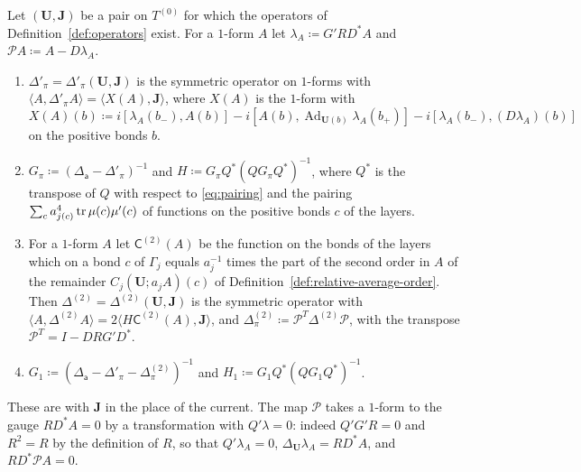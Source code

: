 \documentclass[11pt]{preprint}
\newcommand{\Ad}{\operatorname{Ad}}
\numberwithin{equation}{section}
\begin{document}
\begin{definition}\label{def:landau-operators}
Let $(\mathbf U, \mathbf J)$ be a pair on $T^{(0)}$ for which the operators of Definition~\ref{def:operators} exist. For a $1$-form $A$ let $\lambda_A \coloneqq G'RD^*A$ and $\mathcal PA \coloneqq A - D\lambda_A$.
\begin{enumerate}[label=(\roman*)]
\item $\Delta'_\pi = \Delta'_\pi(\mathbf U, \mathbf J)$ is the symmetric operator on $1$-forms with $\langle A, \Delta'_\pi A\rangle = \langle X(A), \mathbf J\rangle$, where $X(A)$ is the $1$-form with
\begin{equation}\label{eq:gauge-defect}
    X(A)(b) \coloneqq i[\lambda_A(b_-), A(b)] - i[A(b), \Ad_{\mathbf U(b)}\lambda_A(b_+)] - i[\lambda_A(b_-), (D\lambda_A)(b)]
\end{equation}
on the positive bonds $b$.
\item $G_\pi \coloneqq (\Delta_{\mathsf a} - \Delta'_\pi)^{-1}$ and $H \coloneqq G_\pi Q^*(QG_\pi Q^*)^{-1}$, where $Q^*$ is the transpose of $Q$ with respect to \eqref{eq:pairing} and the pairing $\sum_ca_{j(c)}^4\operatorname{tr}\mu(c)\mu'(c)$ of functions on the positive bonds $c$ of the layers.
\item For a $1$-form $A$ let $\mathsf C^{(2)}(A)$ be the function on the bonds of the layers which on a bond $c$ of $\Gamma_j$ equals $a_j^{-1}$ times the part of the second order in $A$ of the remainder $C_j(\mathbf U; a_jA)(c)$ of Definition~\ref{def:relative-average-order}. Then $\Delta^{(2)} = \Delta^{(2)}(\mathbf U, \mathbf J)$ is the symmetric operator with $\langle A, \Delta^{(2)}A\rangle = 2\langle H\mathsf C^{(2)}(A), \mathbf J\rangle$, and $\Delta^{(2)}_\pi \coloneqq \mathcal P^T\Delta^{(2)}\mathcal P$, with the transpose $\mathcal P^T = I - DRG'D^*$.
\item $G_1 \coloneqq (\Delta_{\mathsf a} - \Delta'_\pi - \Delta^{(2)}_\pi)^{-1}$ and $H_1 \coloneqq G_1Q^*(QG_1Q^*)^{-1}$.
\end{enumerate}
\end{definition}

These are \cite[(3.119)--(3.129), (3.134), (3.135)]{BalabanPBG} with $\mathbf J$ in the place of the current. The map $\mathcal P$ takes a $1$-form to the gauge $RD^*A = 0$ by a transformation with $Q'\lambda = 0$: indeed $Q'G'R = 0$ and $R^2 = R$ by the definition of $R$, so that $Q'\lambda_A = 0$, $\Delta_{\mathbf U}\lambda_A = RD^*A$, and $RD^*\mathcal PA = 0$.
\end{document}
